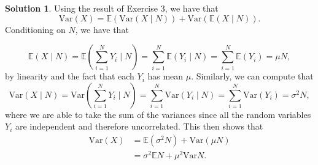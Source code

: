 \documentclass[12pt]{article}
\newcommand{\Expect}{\mathbb{E}}
\newcommand{\Var}{\text{Var}}
\theoremstyle{definition}
\newtheorem{sol}{Solution}
\theoremstyle{remark}
\begin{document}
\begin{sol} \leavevmode
    Using the result of Exercise 3, we have that 
    \begin{equation}
        \Var(X) = \Expect( \Var(X\mid N) ) + \Var(\Expect(X\mid N)).
    \end{equation}
    Conditioning on $N$, we have that 

    \begin{equation}
        \Expect(X\mid N) = \Expect\left( \sum_{i=1}^{N}Y_i \mid N\right) = \sum_{i=1}^{N}\Expect\left( Y_i \mid N\right) = \sum_{i=1}^{N} \Expect(Y_i) = \mu N, 
   \end{equation}
  by linearity and the fact that each $Y_i$ has mean $\mu$. Similarly, we can compute that 
   \begin{equation}
       \Var(X\mid N) = \Var\left(  \sum_{i=1}^{N}Y_i \mid N\right) = \sum_{i=1}^{N}\Var\left( Y_i \mid N\right) = \sum_{i=1}^{N} \Var(Y_i) = \sigma^2 N, 
   \end{equation}
where we are able to take the sum of the variances since all the random variables $Y_i$ are independent and therefore uncorrelated. This then shows that
\begin{align}
    \Var(X) &= \Expect(\sigma^2 N) + \Var( \mu N)\\
            &= \sigma^2 \Expect N + \mu^2 \Var N.
\end{align}
\end{sol}
\end{document}
